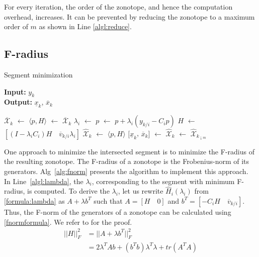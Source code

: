 For every iteration, the order of the zonotope, and hence the computation overhead, increases. It can be prevented by reducing the zonotope to a maximum order of $m$ as shown in Line \ref{algl:reduce}.

\subsection{F-radius}
\begin{algorithm}[H]
        \caption{Segment minimization}
        \textbf{Input:} $y_k$\\
 		\textbf{Output:} $\underline{x}_k$, $\overline{x}_k$
        \begin{algorithmic}[1]
        \State $\overline{\mathcal{X}}_k$ $\gets$ 
        \State $\langle p,H \rangle$ $\gets$ $\overline{\mathcal{X}}_k$
        	\State $\lambda_i$ $\gets$  \label{algl:lambda}
        	\State $p$ $\gets$ $p + \lambda_i (y_{k/i} - C_i p)$ \label{algl:center}
        	\State $H$ $\gets$ $[(I- \lambda_i C_i)H \quad \overline{v}_{k/i}\lambda_i]$  \label{algl:g}
        \EndFor
        \State $\hat{\mathcal{X}}_k$ $\gets$ $\langle p, H \rangle$
        \State $[\underline{x}_k$, $\overline{x}_k]$ $\gets$ 
        \State $\hat{\mathcal{X}}_k$ $\gets$ $\hat{\mathcal{X}}_{k_{\downarrow m}}$
        \end{algorithmic}
        \label{alg:fnorm}
\end{algorithm}
One approach to minimize the intersected segment is to minimize the F-radius of the resulting zonotope. The F-radius of a zonotope is the Frobenius-norm of its generators. Alg~\ref{alg:fnorm} presents the algorithm to implement this approach.\\
In Line~\ref{algl:lambda}, the $\lambda_i$, corresponding to the segment with minimum F-radius, is computed. To derive the $\lambda_i$, let us rewrite $\hat{H}_i(\lambda_i)$ from \eqref{formula:lambda} as $A + \lambda b^T$ such that $A= [H \quad 0]$ and $b^T = [-C_i H \quad \overline{v}_{k/i}]$. Thus, the F-norm of the generators of a zonotope can be calculated using \eqref{fnormformula}. We refer to \cite{Alamo2005} for the proof.
\begin{equation}
\label{fnormformula}
\begin{split}
||H||_{F}^2 & = ||A + \lambda b^T||^{2}_F \\
&= 2\lambda^T A b+ (b^Tb)\lambda^T\lambda + tr(A^TA)
\end{split}
\end{equation}

